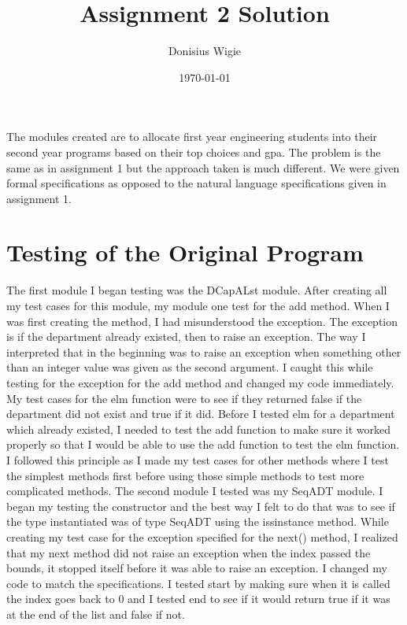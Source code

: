 \documentclass[12pt]{article}
\title{Assignment 2 Solution}
\author{Donisius Wigie}
\date{\today}
\begin{document}
\maketitle

The modules created are to allocate first year engineering students into their second year programs based on their top choices and gpa. The problem is the same as in assignment 1 but the approach taken is much different. We were given formal specifications as opposed to the natural language specifications given in assignment 1.

\section{Testing of the Original Program}

The first module I began testing was the DCapALst module. After creating all my test cases for this module, my module one test for the add method. When I was first creating the method, I had misunderstood the exception. The exception is if the department already existed, then to raise an exception. The way I interpreted that in the beginning was to raise an exception when something other than an integer value was given as the second argument. I caught this while testing for the exception for the add method and changed my code immediately. My test cases for the elm function were to see if they returned false if the department did not exist and true if it did. Before I tested elm for a department which already existed, I needed to test the add function to make sure it worked properly so that I would be able to use the add function to test the elm function. I followed this principle as I made my test cases for other methods where I test the simplest methods first before using those simple methods to test more complicated methods.
The second module I tested was my SeqADT module. I began my testing the constructor and the best way I felt to do that was to see if the type instantiated was of type SeqADT using the issinstance method. While creating my test case for the exception specified for the next() method, I realized that my next method did not raise an exception when the index passed the bounds, it stopped itself before it was able to raise an exception. I changed my code to match the specifications. I tested start by making sure when it is called the index goes back to 0 and I tested end to see if it would return true if it was at the end of the list and false if not.
\end{document}
